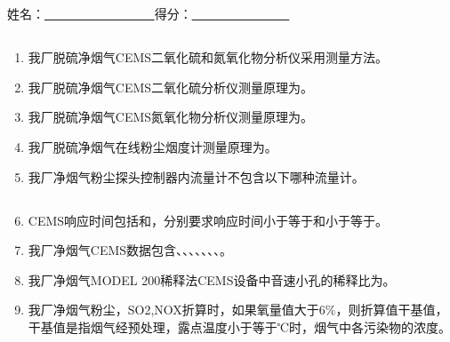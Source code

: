 \documentclass{book}
\begin{document}
		\else						%
		\fi						%
\chapter[2024年09月份技术培训考试]{	\hspace*{-0.3em}}
姓名：\uline{ \ \  \  \ \ \ \ \ \ \ \ \ \ \ \ \ \ }\hfill 得分：\uline{ \ \  \  \ \ \ \ \ \  \ \ \ \ \ \ }
\section{}
\begin{enumerate}
\item 我厂脱硫净烟气CEMS二氧化硫和氮氧化物分析仪采用测量方法。
\item 我厂脱硫净烟气CEMS二氧化硫分析仪测量原理为。
\item 我厂脱硫净烟气CEMS氮氧化物分析仪测量原理为。
\item 我厂脱硫净烟气在线粉尘烟度计测量原理为。
\item 我厂净烟气粉尘探头控制器内流量计不包含以下哪种流量计。
\end{enumerate}
\section{}
\begin{enumerate}
	\setcounter{enumi}{5}
	\item CEMS响应时间包括和，分别要求响应时间小于等于和小于等于。
\item 我厂净烟气CEMS数据包含、、、、、、、。
	\item 我厂净烟气MODEL 200稀释法CEMS设备中音速小孔的稀释比为。
\item 我厂净烟气粉尘，SO2,NOX折算时，如果氧量值大于6\%，则折算值干基值，干基值是指烟气经预处理，露点温度小于等于℃时，烟气中各污染物的浓度。
\end{enumerate}
\end{document}
